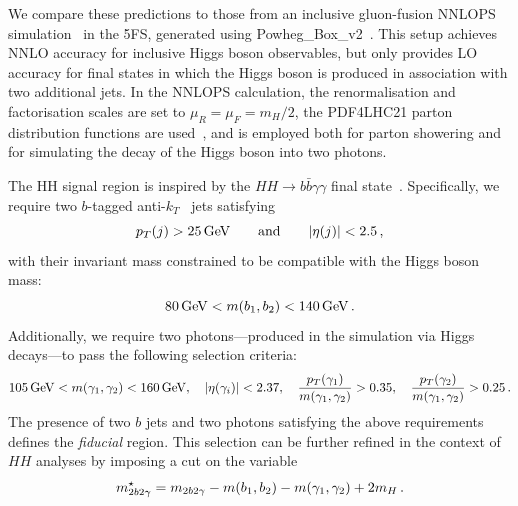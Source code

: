 \documentclass[11pt,a4paper]{article}
\begin{document}
We compare these predictions to those from an inclusive gluon-fusion {\sc NNLOPS} simulation~\cite{hamilton:2012rf,hamilton:2013fea,hamilton:2015nsa} in the 5FS, generated using {\sc Powheg\_Box\_v2}~\cite{nason:2004rx,frixione:2007vw,alioli:2010xd}. This setup achieves NNLO accuracy for inclusive Higgs boson observables, but only provides LO accuracy for final states in which the Higgs boson is produced in association with two additional jets. In the {\sc NNLOPS} calculation, the renormalisation and factorisation scales are set to $\mu_R = \mu_F = m_H/2$, the PDF4LHC21 parton distribution functions are used~\cite{PDF4LHCWorkingGroup:2022cjn}, and  is employed both for parton showering and for simulating the decay of the Higgs boson into two photons.



The HH signal region is inspired by the $HH \to b\bar{b}\gamma\gamma$ final state~\cite{HDBS-2021-10,CMS-HIG-19-018}. Specifically, we require two $b$-tagged anti-$k_T$~\cite{Cacciari:2005hq,Cacciari:2008gp,Cacciari:2011ma} jets satisfying
\begin{equation}
\label{eq:ptjcuts}
p_T(j) > 25\,\mathrm{GeV} \qquad {\rm and} \qquad |\eta(j)| < 2.5\,,
\end{equation}
with their invariant mass constrained to be compatible with the Higgs boson mass:
\begin{equation}
    \label{eq:mbjcut}
    80\,\mathrm{GeV} < m(b_1,b_2)< 140\,\mathrm{GeV}\,.
\end{equation}
Additionally, we require two photons—produced in the simulation via Higgs decays—to pass the following selection criteria:
\begin{equation}
\label{eq:photoncuts}
    105\,\mathrm{GeV} < m(\gamma_1, \gamma_2) < 160\,\mathrm{GeV}, \quad |\eta(\gamma_i)|< 2.37, \quad
    \frac{p_T(\gamma_1)}{m(\gamma_1, \gamma_2)} > 0.35, \quad \frac{p_T(\gamma_2)}{m(\gamma_1, \gamma_2)} > 0.25\,.
\end{equation}
The presence of two $b$ jets and two photons satisfying the above requirements defines the \emph{fiducial} region. This selection can be further refined in the context of $HH$ analyses by imposing a cut on the variable
\begin{equation}
\label{eq:mbbggs}
    m_{2b2\gamma}^{\star} = m_{2b2\gamma} - m(b_1,b_2) - m(\gamma_1,\gamma_2) + 2m_H \,.
\end{equation}
\end{document}
